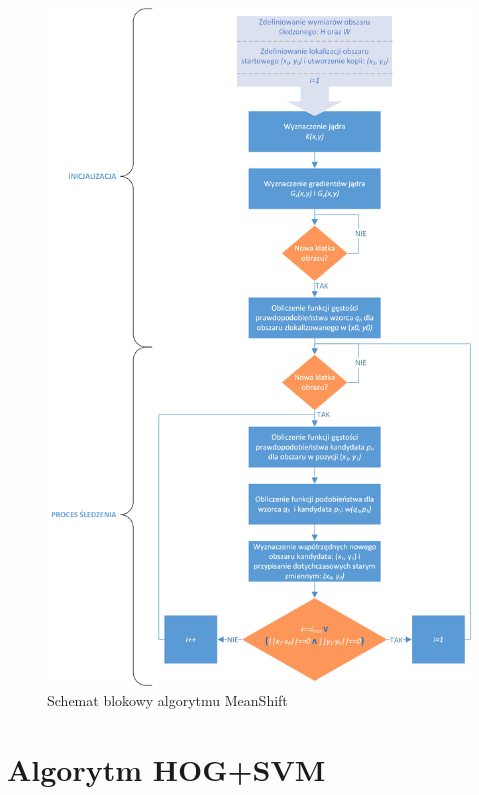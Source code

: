 \begin{figure}
	\centering
	\hspace*{-3cm}
	\includegraphics[width=14.5cm]{2_MS_visio.png}
	\caption{Schemat blokowy algorytmu MeanShift}
	\label{fig:MS_scheme}
\end{figure}



\section{Algorytm HOG+SVM}
\label{sec:HOG&SVM}

